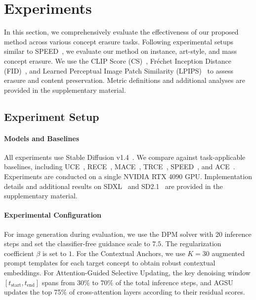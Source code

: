 \documentclass[letterpaper]{article} %
\begin{document}
\section{Experiments}
In this section, we comprehensively evaluate the effectiveness of our proposed method across various concept erasure tasks. Following experimental setups similar to SPEED~\cite{SPEED}, we evaluate our method on instance, art-style, and mass concept erasure. We use the CLIP Score (CS)~\cite{clip}, Fr\'echet Inception Distance (FID)~\cite{FID}, and Learned Perceptual Image Patch Similarity (LPIPS)~\cite{LPIPS} to assess erasure and content preservation. Metric definitions and additional analyses are provided in the supplementary material.



\subsection{Experiment Setup}
\paragraph{Models and Baselines}
All experiments use Stable Diffusion v1.4~\cite{SD1-4}. We compare against task-applicable baselines, including UCE~\cite{UCE}, RECE~\cite{RECE}, MACE~\cite{MACE}, TRCE~\cite{TRCE}, SPEED~\cite{SPEED}, and ACE~\cite{ACE}. 
Experiments are conducted on a single NVIDIA RTX 4090 GPU. Implementation details  and additional results on SDXL~\cite{SDXL-model} and SD2.1~\cite{StableDiffusion2.1} are provided in the supplementary material.

\paragraph{Experimental Configuration}
For image generation during evaluation, we use the DPM solver with 20 inference steps and set the classifier-free guidance scale to $7.5$. The regularization coefficient $\beta$ is set to $1$. For the Contextual Anchors, we use $K=30$ augmented prompt templates for each target concept to obtain robust contextual embeddings. For Attention-Guided Selective Updating, the key denoising window $[t_{\text{start}},t_{\text{end}}]$ spans from $30\%$ to $70\%$ of the total inference steps, and AGSU updates the top 75\% of cross-attention layers according to their residual scores.
\end{document}
